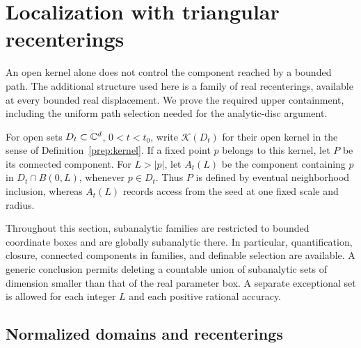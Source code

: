 \section{Localization with triangular recenterings}
\label{loc:section}

An open kernel alone does not control the component reached by a bounded
path.  The additional structure used here is a family of real
recenterings, available at every bounded real displacement.  We prove the
required upper containment, including the uniform path selection needed
for the analytic-disc argument.

\label{loc:kernel}
For open sets $D_t\subset\mathbb C^d$, $0<t<t_0$, write $\mathcal K(D_t)$
for their open kernel in the sense of Definition~\ref{prep:kernel}.
If a fixed point $p$ belongs to this kernel, let $P$ be its connected
component.  For $L>|p|$, let $A_t(L)$ be the component containing
$p$ in $D_t\cap B(0,L)$, whenever $p\in D_t$.  Thus $P$ is defined
by eventual neighborhood inclusion, whereas $A_t(L)$ records access
from the seed at one fixed scale and radius.

Throughout this section, subanalytic families are restricted to bounded
coordinate boxes and are globally subanalytic there.  In particular,
quantification, closure, connected components in families, and definable
selection are available.  A generic conclusion permits deleting a
countable union of subanalytic sets of dimension smaller than that of the
real parameter box.  A separate exceptional set is allowed for each
integer $L$ and each positive rational accuracy.

\subsection{Normalized domains and recenterings}

